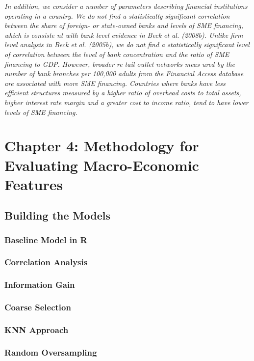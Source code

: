 	\textit{In addition, we consider a number of parameters describing financial institutions operating in a 
		country.  We do not find a statistically significant
		correlation between the share of foreign- or 
		state-owned banks and levels of 
		SME financing, which is consiste
		nt with bank level evidence in 
		Beck 
		et al.
		(2008b).  Unlike firm level analysis in Beck 
		et al.
		(2005b), we do not find a 
		statistically significant level of 
		correlation between the level of 
		bank concentration and the ratio 
		of SME financing to GDP. However, broader re
		tail outlet networks meas
		ured by the number of 
		bank branches per 100,000 adults from the 
		Financial Access
		database are associated with more 
		SME financing. Countries where banks have less 
		efficient structures measured by a higher ratio 
		of overhead costs to total assets, 
		higher interest rate margin and a 
		greater cost to income ratio,  
		tend to have lower levels of SME financing. }

\section{Chapter 4: Methodology for Evaluating Macro-Economic Features}
\subsection{Building the Models}
\subsubsection{Baseline Model in R}
\subsubsection{Correlation Analysis}
\subsubsection{Information Gain}
\subsubsection{Coarse Selection}
\subsubsection{KNN Approach}
\subsubsection{Random Oversampling}
